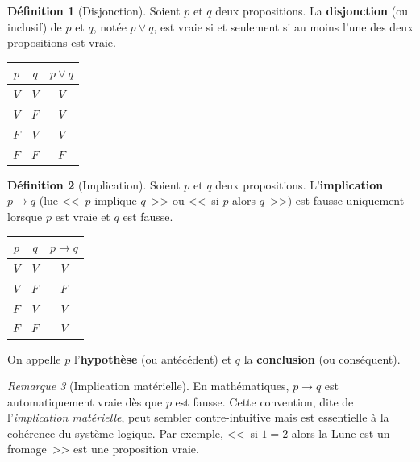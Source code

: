 \documentclass[12pt,a4paper,openany]{book}
\theoremstyle{definition}
\newtheorem{definition}{Définition}[chapter]
\theoremstyle{plain}
\theoremstyle{remark}
\newtheorem{remarque}[definition]{Remarque}
\begin{document}
\begin{definition}[Disjonction]\label{def:disjonction}
  Soient $p$ et $q$ deux propositions. La \textbf{disjonction} (ou inclusif) de $p$ et $q$, not\'ee $p \lor q$\index{$\lor$}, est vraie si et seulement si au moins l'une des deux propositions est vraie.

  \medskip
  \begin{center}
  \begin{tabular}{cc|c}
    \toprule
    $p$ & $q$ & $p \lor q$ \\ \midrule
    $V$ & $V$ & $V$ \\
    $V$ & $F$ & $V$ \\
    $F$ & $V$ & $V$ \\
    $F$ & $F$ & $F$ \\
    \bottomrule
  \end{tabular}
  \end{center}
\end{definition}

\begin{definition}[Implication]\label{def:implication}
  Soient $p$ et $q$ deux propositions. L'\textbf{implication} $p \to q$\index{$\to$} (lue <<~$p$ implique $q$~>> ou <<~si $p$ alors $q$~>>) est fausse uniquement lorsque $p$ est vraie et $q$ est fausse.

  \medskip
  \begin{center}
  \begin{tabular}{cc|c}
    \toprule
    $p$ & $q$ & $p \to q$ \\ \midrule
    $V$ & $V$ & $V$ \\
    $V$ & $F$ & $F$ \\
    $F$ & $V$ & $V$ \\
    $F$ & $F$ & $V$ \\
    \bottomrule
  \end{tabular}
  \end{center}

  On appelle $p$ l'\textbf{hypoth\`ese} (ou ant\'ec\'edent) et $q$ la \textbf{conclusion} (ou cons\'equent).
\end{definition}

\begin{remarque}[Implication mat\'erielle]\label{rem:implication-materielle}
  En math\'ematiques, $p \to q$ est automatiquement vraie d\`es que $p$ est fausse. Cette convention, dite de l'\emph{implication mat\'erielle}, peut sembler contre-intuitive mais est essentielle \`a la coh\'erence du syst\`eme logique. Par exemple, <<~si $1 = 2$ alors la Lune est un fromage~>> est une proposition vraie.
\end{remarque}
\end{document}
